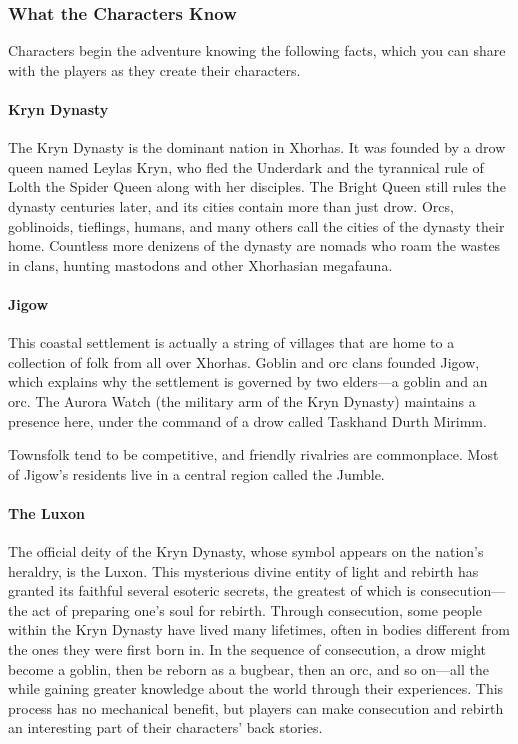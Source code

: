 \documentclass[a4paper, 11pt, bg=full, twocolumn, nooutline]{dndbook}
\begin{document}
\subsubsection{What the Characters Know}

Characters begin the adventure knowing the following facts, which you can share with the players as they create their characters.

\paragraph{Kryn Dynasty}

The Kryn Dynasty is the dominant nation in Xhorhas. It was founded by a drow queen named Leylas Kryn, who fled the Underdark and the tyrannical rule of Lolth the Spider Queen along with her disciples. The Bright Queen still rules the dynasty centuries later, and its cities contain more than just drow. Orcs, goblinoids, tieflings, humans, and many others call the cities of the dynasty their home. Countless more denizens of the dynasty are nomads who roam the wastes in clans, hunting mastodons and other Xhorhasian megafauna.

\paragraph{Jigow}

This coastal settlement is actually a string of villages that are home to a collection of folk from all over Xhorhas. Goblin and orc clans founded Jigow, which explains why the settlement is governed by two elders---a goblin and an orc. The Aurora Watch (the military arm of the Kryn Dynasty) maintains a presence here, under the command of a drow called Taskhand Durth Mirimm.

Townsfolk tend to be competitive, and friendly rivalries are commonplace. Most of Jigow's residents live in a central region called the Jumble.

\paragraph{The Luxon}

The official deity of the Kryn Dynasty, whose symbol appears on the nation's heraldry, is the Luxon. This mysterious divine entity of light and rebirth has granted its faithful several esoteric secrets, the greatest of which is consecution---the act of preparing one's soul for rebirth. Through consecution, some people within the Kryn Dynasty have lived many lifetimes, often in bodies different from the ones they were first born in. In the sequence of consecution, a drow might become a goblin, then be reborn as a bugbear, then an orc, and so on---all the while gaining greater knowledge about the world through their experiences. This process has no mechanical benefit, but players can make consecution and rebirth an interesting part of their characters' back stories.
\end{document}
